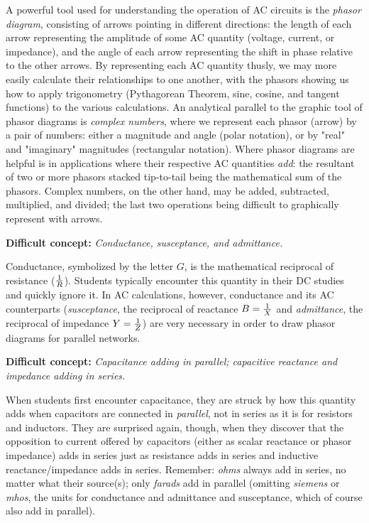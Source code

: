 A powerful tool used for understanding the operation of AC circuits is the {\it phasor diagram}, consisting of arrows pointing in different directions: the length of each arrow representing the amplitude of some AC quantity (voltage, current, or impedance), and the angle of each arrow representing the shift in phase relative to the other arrows.  By representing each AC quantity thusly, we may more easily calculate their relationships to one another, with the phasors showing us how to apply trigonometry (Pythagorean Theorem, sine, cosine, and tangent functions) to the various calculations.  An analytical parallel to the graphic tool of phasor diagrams is {\it complex numbers}, where we represent each phasor (arrow) by a pair of numbers: either a magnitude and angle (polar notation), or by "real" and "imaginary" magnitudes (rectangular notation).  Where phasor diagrams are helpful is in applications where their respective AC quantities {\it add}: the resultant of two or more phasors stacked tip-to-tail being the mathematical sum of the phasors.  Complex numbers, on the other hand, may be added, subtracted, multiplied, and divided; the last two operations being difficult to graphically represent with arrows.

\vskip 10pt

\noindent
{\bf Difficult concept: } {\it Conductance, susceptance, and admittance.}

Conductance, symbolized by the letter $G$, is the mathematical reciprocal of resistance ($1 \over R$).  Students typically encounter this quantity in their DC studies and quickly ignore it.  In AC calculations, however, conductance and its AC counterparts ({\it susceptance}, the reciprocal of reactance $B = {1 \over X}$ and {\it admittance}, the reciprocal of impedance $Y = {1 \over Z}$) are very necessary in order to draw phasor diagrams for parallel networks.

\vskip 10pt

\noindent
{\bf Difficult concept: } {\it Capacitance adding in parallel; capacitive reactance and impedance adding in series.}

When students first encounter capacitance, they are struck by how this quantity adds when capacitors are connected in {\it parallel}, not in series as it is for resistors and inductors.  They are surprised again, though, when they discover that the opposition to current offered by capacitors (either as scalar reactance or phasor impedance) adds in series just as resistance adds in series and inductive reactance/impedance adds in series.  Remember: {\it ohms} always add in series, no matter what their source(s); only {\it farads} add in parallel (omitting {\it siemens} or {\it mhos}, the units for conductance and admittance and susceptance, which of course also add in parallel).

